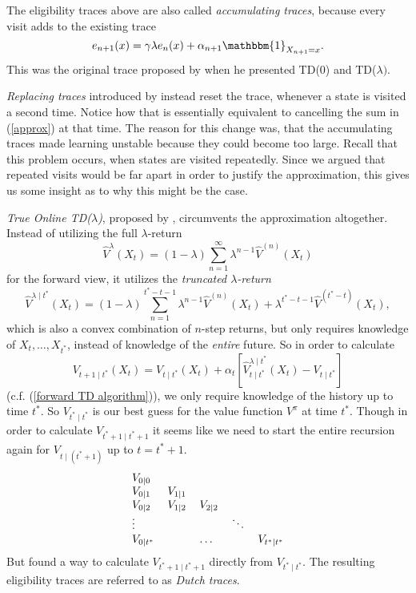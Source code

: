 The eligibility traces above are also called \emph{accumulating traces}, because every visit adds to the existing trace
\[
	e_{n+1}(x) = \gamma\lambda e_n(x) + \alpha_{n+1} \mathbbm{1}_{X_{n+1}=x}.
\]
This was the original trace proposed by \textcite{suttonLearningPredictMethods1988} when he presented TD(0) and TD(\(\lambda)\). 

\emph{Replacing traces} introduced by \textcite{singhReinforcementLearningReplacing1996} instead reset the trace, whenever a state is visited a second time. Notice how that is essentially equivalent to cancelling the sum in (\ref{approx}) at that time. The reason for this change was, that the accumulating traces made learning unstable because they could become too large. Recall that this problem occurs, when states are visited repeatedly. Since we argued that repeated visits would be far apart in order to justify the approximation, this gives us some insight as to why this might be the case. 

\emph{True Online TD(\(\lambda\))}, proposed by \textcite{vanseijenTrueOnlineTD2014}, circumvents the approximation altogether. Instead of utilizing the full \(\lambda\)-return
\[
	\hat{V}^\lambda(X_t)=(1-\lambda)\sum_{n=1}^\infty \lambda^{n-1} \hat{V}^{(n)}(X_t)
\]
for the forward view, it utilizes the \emph{truncated \(\lambda\)-return}
\[
	\hat{V}^{\lambda\mid t^*}(X_t)=(1-\lambda)\sum_{n=1}^{t^*-t-1} \lambda^{n-1} \hat{V}^{(n)}(X_t) + \lambda^{t^*-t-1}\hat{V}^{(t^*-t)}(X_t),
\]
which is also a convex combination of \(n\)-step returns, but only requires knowledge of \(X_t,\dots,X_{t^*}\), instead of knowledge of the \emph{entire} future. So in order to calculate
\[
	V_{t+1\mid t^*}(X_t)
	=V_{t\mid t^*}(X_t)
	+\alpha_t\left[\hat{V}_{t\mid t^*}^{\lambda\mid t^*}(X_t)-V_{t\mid t^*}\right]
\]
(c.f. (\ref{forward TD algorithm})), we only require knowledge of the history up to time \(t^*\). So \(V_{t^*\mid t^*}\) is our best guess for the value function \(V^\pi\) at time \(t^*\). 
Though in order to calculate \(V_{t^*+1\mid t^*+1}\) it seems like we need to start the entire recursion again for \(V_{t\mid (t^*+1)}\) up to \(t=t^*+1\).
\[
\begin{tabular}{l l l l l}
	\(V_{0\mid 0}\) & & & &\\
	\(V_{0\mid 1}\) & \(V_{1\mid 1}\) & & &\\
	\(V_{0\mid 2}\) & \(V_{1\mid 2}\) &\(V_{2\mid 2}\) & &\\
	\(\vdots\) & & & \(\ddots\) & \\
	\(V_{0\mid t^*}\) & &\dots & & \(V_{t^*\mid t^*}\)
\end{tabular}
\]
But \textcite{vanseijenTrueOnlineTD2014} found a way to calculate \(V_{t^*+1\mid t^*+1}\) directly from \(V_{t^*\mid t^*}\). The resulting eligibility traces are referred to as \emph{Dutch traces}.

